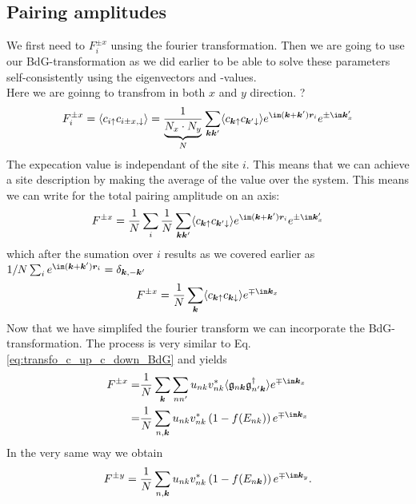 \documentclass[../main.tex]{subfile}
\begin{document}
\subsection{Pairing amplitudes}
We first need to $F_i^{\pm x}$ unsing the fourier transformation. Then we are going to use our BdG-transformation as we did earlier to be 
able to solve these parameters self-consistently using the eigenvectors and -values.\\

Here we are goinng to transfrom in both $x$ and $y$ direction. ?
\begin{equation*}
    F_i^{\pm x} = \langle c_{i\uparrow} c_{i\pm x,\downarrow}\rangle =
    \frac{1}{\underbrace{N_x\cdot N_y}_{N}} \sum_{\bm{k}\bm{k}'} \langle c_{\bm{k}\uparrow} c_{\bm{k}'\downarrow} \rangle e^{\im(\bm{k} + \bm{k}')\bm{r}_i} e^{\pm\im\bm{k}'_x}
\end{equation*}
The expecation value is independant of the site $i$. This means that we can achieve a site description by making the average of the value over the system. This means 
we can write for the total pairing amplitude on an axis:
\begin{equation*}
    F^{\pm x} = 
    \frac{1}{N}\sum_i \frac{1}{N} \sum_{\bm{k}\bm{k}'} \langle c_{\bm{k}\uparrow} c_{\bm{k}'\downarrow} \rangle e^{\im(\bm{k} + \bm{k}')\bm{r}_i} e^{\pm\im\bm{k}'_x}
\end{equation*}
which after the sumation over $i$ results as we covered earlier as $1/N \sum_{i} e^{\im(\bm{k} + \bm{k}')\bm{r}_i} = \delta_{\bm{k},-\bm{k}'}$
\begin{equation*}
    F^{\pm x} = 
    \frac{1}{N} \sum_{\bm{k}} \langle c_{\bm{k}\uparrow} c_{\bm{k}\downarrow} \rangle e^{\mp\im\bm{k}_x}
\end{equation*}
Now that we have simplifed the fourier transform we can incorporate the BdG-transformation. The process is very similar to Eq.\ref{eq:transfo_c_up_c_down_BdG} and yields
\begin{equation}\label{eq:transfo_F_x}
    \begin{aligned}
    F^{\pm x} =& \frac{1}{N}\sum_{\bm{k}}\sum_{nn'} u_{nk}v_{nk}^{\ast} \langle \mathfrak{g}_{n\bm{k}} \mathfrak{g}_{n'\bm{k}}^{\dagger} \rangle e^{\mp\im\bm{k}_x}\\
        =& \frac{1}{N} \sum_{n,\bm{k}} u_{nk} v_{nk}^{\ast}\left(1 - f(E_{nk})\right) e^{\mp \im \bm{k}_x}
    \end{aligned}
\end{equation}
In the very same way we obtain 
\begin{equation}
    F^{\pm y}= \frac{1}{N} \sum_{n,\bm{k}} u_{nk} v_{nk}^{\ast}\left(1 - f(E_{n\bm{k}})\right) e^{\mp \im \bm{k}_y}.
\end{equation}
\end{document}
